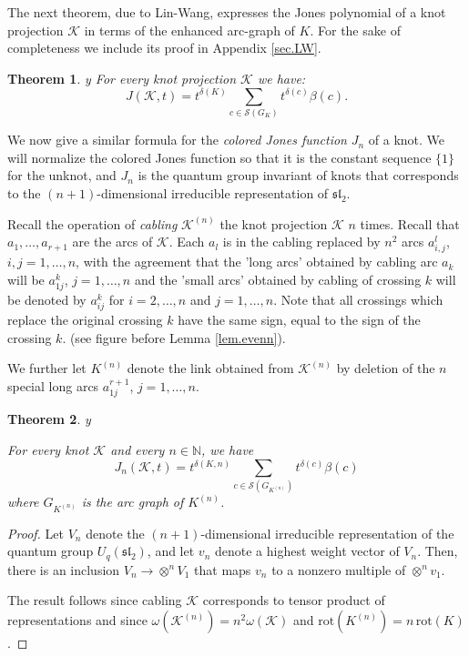 \documentclass{amsart}
\theoremstyle{plain}
\newtheorem{theorem}{Theorem}
\theoremstyle{definition}
\theoremstyle{remark}
\def\printname#1{
        \if\draft y
                \smash{\makebox[0pt]{\hspace{-0.5in}
                        \raisebox{8pt}{\tt\tiny #1}}}
        \fi
}
\def\lbl#1{\label{#1}\printname{#1}}
\def\BN{\mathbb N}
\def\K{\mathcal K}
\def\w{\omega}
\def\d{\delta}
\def\b{\beta}
\def\rot{\mathrm{rot}}
\def\longto{\longrightarrow}
\def\Sev{{\mathcal S}}
\def\longto{\longrightarrow}
\begin{document}
The next theorem, due to Lin-Wang, expresses the Jones polynomial of
a knot projection $\K$ in terms of the enhanced arc-graph of $K$. 
For the sake of completeness we include
its proof in Appendix \ref{sec.LW}.

\begin{theorem}
\lbl{thm.arcjones}\cite{LW} 
For every knot projection $\K$ we have:
$$
J(\K, t)= t^{\d(K)} \sum_{c \in \Sev(G_K)} t^{\d(c)} \b(c).
$$
\end{theorem}

We now give a similar formula for the {\em colored Jones function} $J_n$ 
of a knot. 
We will normalize the colored Jones function so that it is the constant
sequence $\{1\}$ for the unknot, and $J_n$ is the quantum group invariant
of knots that corresponds to the $(n+1)$-dimensional irreducible representation
of $\mathfrak{sl}_2$.

Recall the operation of {\em cabling} $\K^{(n)}$ the knot projection 
$\K$ $n$ times.
 Recall that $a_1,\dots, a_{r+1}$ are the arcs of $\K$.
Each $a_l$ is in the cabling replaced by $n^2$ arcs $a^l_{i,j}$, 
$i,j=1,\dots, n$,
with the agreement that the 'long arcs' obtained by cabling arc $a_k$ will be
$a^k_{1j}$, $j=1,\dots, n$ and the 'small arcs' obtained by cabling of crossing
$k$ will be denoted by $a^k_{ij}$ for $i=2,\dots, n$ and $j=1,\dots, n$.
Note that all crossings which replace the original crossing $k$ have the
same sign, equal to the sign of the crossing $k$.
(see figure before Lemma \ref{lem.evenn}). 

We further let $K^{(n)}$ denote the link obtained from $\K^{(n)}$ by deletion
of the $n$ special long arcs $a^{r+1}_{1j}$, $j=1,\dots, n$.

\begin{theorem}
\lbl{thm.arcjonesn}
For every knot $\K$ and every $n \in \BN$, we have
$$
J_n(\K, t)=t^{\d(K, n)} 
\sum_{c \in \Sev(G_{K^{(n)}})}
t^{\d(c)} \b(c) 
$$
where $G_{K^{(n)}}$ is the arc graph of $K^{(n)}$.
\end{theorem}

\begin{proof}
Let $V_n$ denote the $(n+1)$-dimensional irreducible representation of the
quantum group $U_q(\mathfrak{sl}_2)$, and let $v_n$ denote a highest weight 
vector of $V_n$. Then, there is an inclusion $V_n \longto \otimes^n V_1$ that 
maps $v_n$ to a nonzero multiple of $\otimes^n v_1$.  

The result follows since cabling $\K$ corresponds to tensor product of 
representations and since $\w(\K^{(n)})=n^2 \w(\K)$ and $\rot(K^{(n)})=
n\, \rot(K)$. 
\end{proof}
\end{document}
